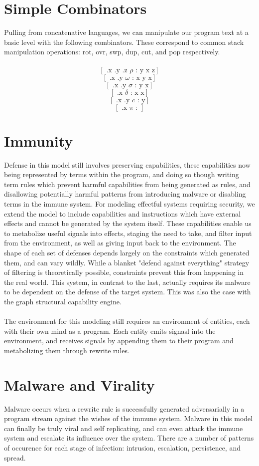 \documentclass{article}
\begin{document}
	\section{Simple Combinators}
	Pulling from concatenative languages, we can manipulate our program text at a basic level with the following combinators. These correspond to common stack manipulation operations: rot, ovr, swp, dup, cut, and pop respectively.\\\\
	$$[\text{ .x .y .z } \rho \text{ : y x z}]$$
	$$[\text{ .x .y } \omega \text{ : x y x}]$$
	$$[\text{ .x .y } \sigma \text{ : y x}]$$
	$$[\text{ .x } \delta \text{ : x x}]$$
	$$[\text{ .x .y } c \text{ : y}]$$
	$$[\text{ .x } \pi \text{ : }]$$
	\section{Immunity}
	Defense in this model still involves preserving capabilities, these capabilities now being represented by terms within the program, and doing so though writing term rules which prevent harmful capabilities from being generated as rules, and disallowing potentially harmful patterns from introducing malware or disabling terms in the immune system. For modeling effectful systems requiring security, we extend the model to include capabilities and instructions which have external effects and cannot be generated by the system itself. These capabilities enable us to metabolize useful signals into effects, staging the need to take, and filter input from the environment, as well as giving input back to the environment. The shape of each set of defenses depends largely on the constraints which generated them, and can vary wildly. While a blanket "defend against everything" strategy of filtering is theoretically possible, constraints prevent this from happening in the real world. This system, in contrast to the last, actually requires its malware to be dependent on the defense of the target system. This was also the case with the graph structural capability engine.\\\\
	The environment for this modeling still requires an environment of entities, each with their own mind as a program. Each entity emits signasl into the environment, and receives signals by appending them to their program and metabolizing them through rewrite rules.
	\section{Malware and Virality}
	Malware occurs when a rewrite rule is successfully generated adversarially in a program stream against the wishes of the immune system. Malware in this model can finally be truly viral and self replicating, and can even attack the immune system and escalate its influence over the system. There are a number of patterns of occurence for each stage of infection: intrusion, escalation, persistence, and spread. 
\end{document}
